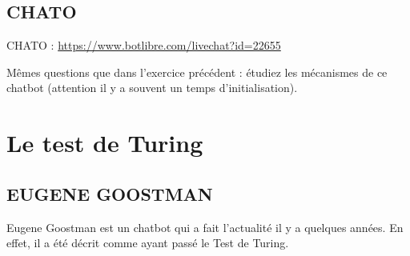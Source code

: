 \subsection{CHATO}

CHATO : \url{https://www.botlibre.com/livechat?id=22655}

 Mêmes questions que dans l'exercice précédent : étudiez les mécanismes de ce chatbot (attention il y a souvent un temps d'initialisation).


\section{Le test de Turing}

\subsection{EUGENE GOOSTMAN}

Eugene Goostman est un chatbot qui a fait l'actualité il y a quelques années. En effet, il a été décrit comme ayant passé le Test de Turing. 

